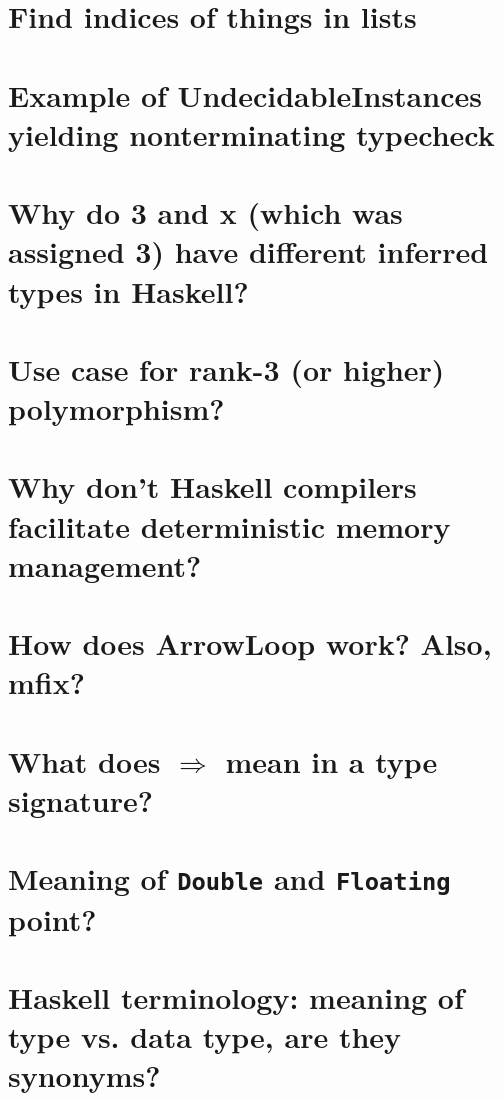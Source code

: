 \documentclass{book}
\begin{document}
\section{Find indices of things in lists}


\section{Example of UndecidableInstances yielding nonterminating typecheck}


\section{Why do 3 and x (which was assigned 3) have different inferred types in Haskell?}


\section{Use case for rank-3 (or higher) polymorphism?}


\section{Why don't Haskell compilers facilitate deterministic memory management?}


\section{How does ArrowLoop work? Also, mfix?}


\section{What does $\Rightarrow$ mean in a type signature?}


\section{Meaning of {\tt Double} and {\tt Floating} point?}


\section{Haskell terminology: meaning of type vs. data type, are they synonyms?}

\end{document}
